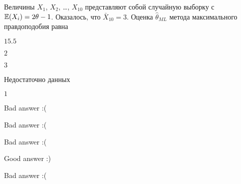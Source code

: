 
\begin{question}
Величины \(X_1\), \(X_2\), \ldots, \(X_{10}\) представляют собой
случайную выборку с \(\operatorname{\mathbb{E}}(X_i) = 2\theta - 1\). Оказалось, что
\(\bar X_{10}=3\). Оценка \(\hat\theta_{ML}\) метода максимального
правдоподобия равна
\begin{answerlist}
  \item \(15.5\)
  \item \(2\)
  \item \(3\)
  \item Недостаточно данных
  \item \(1\)
\end{answerlist}
\end{question}

\begin{solution}
\begin{answerlist}
  \item Bad answer :(
  \item Bad answer :(
  \item Bad answer :(
  \item Good answer :)
  \item Bad answer :(
\end{answerlist}
\end{solution}

